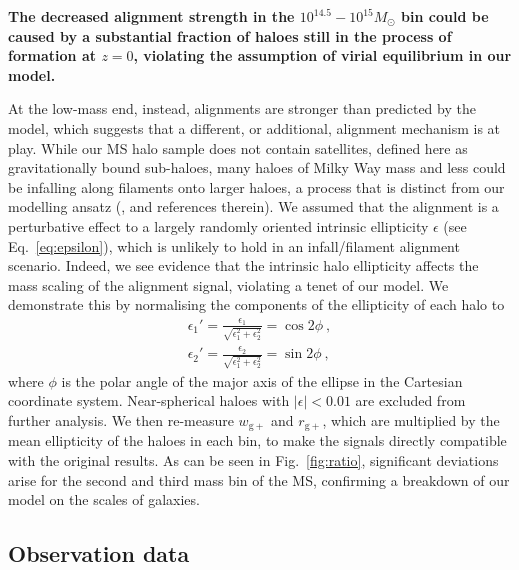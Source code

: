 \documentclass[a4paper,fleqn,usenatbib]{mnras}
\newenvironment{correction}
 {\bfseries}%
  {}%
\begin{document}
\begin{correction}
The decreased alignment strength in the $10^{14.5}-10^{15} M_\odot$ bin could be caused by a substantial fraction of haloes still in the process of formation at $z=0$, violating the assumption of virial equilibrium in our model. 

At the low-mass end, instead, alignments are stronger than predicted by the model, which suggests that a different, or additional, alignment mechanism is at play. While our MS halo sample does not contain satellites, defined here as gravitationally bound sub-haloes, many haloes of Milky Way mass and less could be infalling along filaments onto larger haloes, a process that is distinct from our modelling ansatz (\citealt{ForeroRomeroetal2014}, and references therein). We assumed that the alignment is a perturbative effect to a largely randomly oriented intrinsic ellipticity $\epsilon$ (see Eq.~\ref{eq:epsilon}), which is unlikely to hold in an infall/filament alignment scenario. Indeed, we see evidence that the intrinsic halo ellipticity affects the mass scaling of the alignment signal, violating a tenet of our model. We demonstrate this by normalising the components of the ellipticity of each halo to 
\begin{align}
\label{eq:epsilonprime}
    	\epsilon_{1}' = \frac{\epsilon_1}{\sqrt{\epsilon_1^2 + \epsilon_2^2}} = \cos{2\phi}\ , \\ 
\label{eq:epsilonprimesecond}
           \epsilon_{2}' = \frac{\epsilon_2}{\sqrt{\epsilon_1^2 + \epsilon_2^2}} = \sin{2\phi}\ ,
\end{align}
where $\phi$ is the polar angle of the major axis of the ellipse in the Cartesian coordinate system. Near-spherical haloes with $|\epsilon|<0.01$ are excluded from further analysis. We then re-measure $w_\mathrm{g+}$ and $r_\mathrm{g+}$, which are multiplied by the mean ellipticity of the haloes in each bin, to make the signals directly compatible with the original results. As can be seen in Fig.~\ref{fig:ratio}, significant deviations arise for the second and third mass bin of the MS, confirming a breakdown of our model on the scales of galaxies.
\end{correction}

\subsection{Observation data}
\label{subsec:obsdatard}
\end{document}
